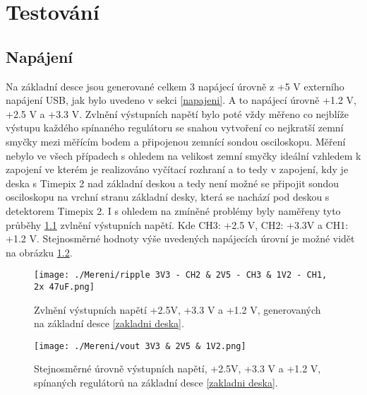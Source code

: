 \chapter{Testování}
\label{testovani}


\section{Napájení}
Na základní desce jsou generované celkem 3 napájecí úrovně z +5 V externího napájení USB, jak bylo uvedeno v sekci \ref{napajeni}. A to napájecí úrovně +1.2 V, +2.5 V a +3.3 V. Zvlnění výstupních napětí bylo poté vždy měřeno co nejblíže výstupu každého spínaného regulátoru se snahou vytvoření co nejkratší zemní smyčky mezi měřícím bodem a připojenou zemnící sondou osciloskopu. Měření nebylo ve všech případech s ohledem na velikost zemní smyčky ideální vzhledem k zapojení ve kterém je realizováno vyčítací rozhraní a to tedy v zapojení, kdy je deska s Timepix 2 nad základní deskou a tedy není možné se připojit sondou osciloskopu na vrchní stranu základní desky, která se nachází pod deskou s detektorem Timepix 2. I s ohledem na zmíněné problémy byly naměřeny tyto průběhy \ref{fig:napeti} zvlnění výstupních napětí. Kde CH3: +2.5 V, CH2: +3.3V a CH1: +1.2 V. Stejnosměrné hodnoty výše uvedených napájecích úrovní je možné vidět na obrázku \ref{fig:urovne}.
\begin{figure}[h!]
	\centering
	\captionsetup{justification=centering}
	\texttt{[image: ./Mereni/ripple 3V3 - CH2 \& 2V5 - CH3 \& 1V2 - CH1, 2x 47uF.png]}
	\caption{Zvlnění výstupních napětí +2.5V, +3.3 V a +1.2 V, generovaných na základní desce \ref{zakladni deska}.} 
	\label{fig:napeti}
\end{figure}

\begin{figure}[h!]
	\centering
	\captionsetup{justification=centering}
	\texttt{[image: ./Mereni/vout 3V3 \& 2V5 \& 1V2.png]}
	\caption{Stejnosměrné úrovně výstupních napětí, +2.5V, +3.3 V a +1.2 V, spínaných regulátorů na základní desce \ref{zakladni deska}.} 
	\label{fig:urovne}
\end{figure}


